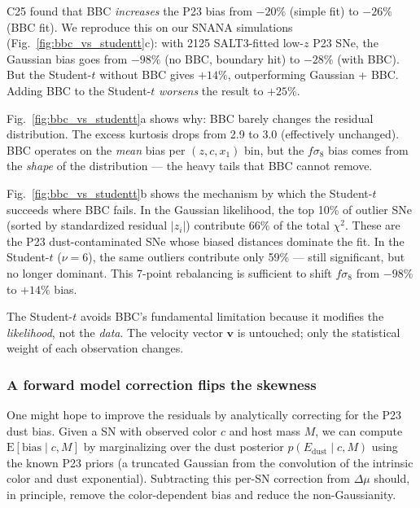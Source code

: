 \documentclass[fleqn,usenatbib]{mnras}
\begin{document}
C25 found that BBC \emph{increases} the P23 bias from $-20\%$
(simple fit) to $-26\%$ (BBC fit). We reproduce this on our
SNANA simulations (Fig.~\ref{fig:bbc_vs_studentt}c): with 2125
SALT3-fitted low-$z$ P23 SNe, the Gaussian bias goes from
$-98\%$ (no BBC, boundary hit) to $-28\%$ (with BBC). But the
Student-$t$ without BBC gives $+14\%$, outperforming
Gaussian + BBC. Adding BBC to the Student-$t$ \emph{worsens}
the result to $+25\%$.

Fig.~\ref{fig:bbc_vs_studentt}a shows why: BBC barely changes
the residual distribution. The excess kurtosis drops from 2.9 to
3.0 (effectively unchanged). BBC operates on the \emph{mean}
bias per $(z, c, x_1)$ bin, but the $f\sigma_8$ bias comes
from the \emph{shape} of the distribution --- the heavy tails
that BBC cannot remove.

Fig.~\ref{fig:bbc_vs_studentt}b shows the mechanism by which
the Student-$t$ succeeds where BBC fails. In the Gaussian
likelihood, the top 10\% of outlier SNe (sorted by standardized
residual $|z_i|$) contribute 66\% of the total $\chi^2$. These
are the P23 dust-contaminated SNe whose biased distances
dominate the fit. In the Student-$t$ ($\nu = 6$), the same
outliers contribute only 59\% --- still significant, but no
longer dominant. This 7-point rebalancing is sufficient to shift
$f\sigma_8$ from $-98\%$ to $+14\%$ bias.

The Student-$t$ avoids BBC's fundamental limitation because it
modifies the \emph{likelihood}, not the \emph{data}. The
velocity vector $\bm{v}$ is untouched; only the statistical
weight of each observation changes.

\subsubsection{A forward model correction flips the skewness}
\label{sec:forward_flip}

One might hope to improve the residuals by analytically correcting
for the P23 dust bias. Given a SN with observed color $c$ and host
mass $M$, we can compute $\mathrm{E}[\mathrm{bias} \mid c, M]$
by marginalizing over the dust posterior
$p(E_\mathrm{dust} \mid c, M)$ using the known P23 priors (a
truncated Gaussian from the convolution of the intrinsic color
and dust exponential). Subtracting this per-SN correction from
$\Delta\mu$ should, in principle, remove the color-dependent bias
and reduce the non-Gaussianity.
\end{document}
